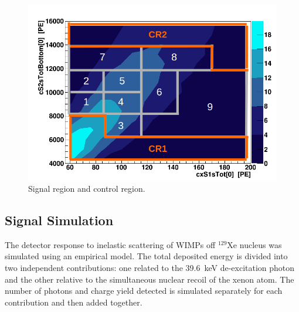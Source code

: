 \begin{figure}[t!]
  \includegraphics[width=\linewidth]{images/bkg_in_sr.png}
  \caption{Signal region and control region.}
  \label{fig:SR}
\end{figure}



\subsection{Signal Simulation} 
The detector response to inelastic scattering of WIMPs  off $^{129}$Xe nucleus was simulated using an empirical model.
The total deposited energy is divided into two independent contributions: one related to the 39.6~keV de-excitation photon and the other  relative to
the simultaneous nuclear recoil of the xenon atom. The number of photons and charge yield detected is simulated separately for each contribution
and then added together.

